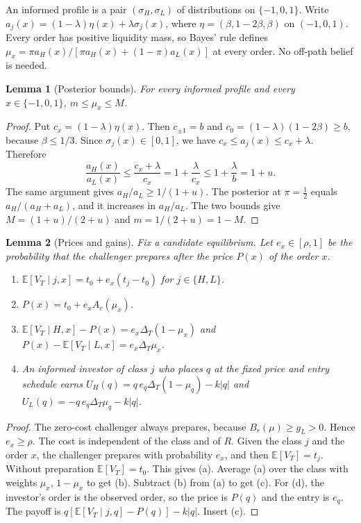 \documentclass[12pt]{article}
\newtheorem{lemma}{Lemma}
\theoremstyle{definition}
\newcommand{\E}{\mathbb E}
\begin{document}
An informed profile is a pair $(\sigma_H,\sigma_L)$ of distributions on $\{-1,0,1\}$.
Write $a_j(x)=(1-\lambda)\eta(x)+\lambda\sigma_j(x)$, where $\eta=(\beta,1-2\beta,\beta)$ on $(-1,0,1)$.
Every order has positive liquidity mass, so Bayes' rule defines $\mu_x=\pi a_H(x)/[\pi a_H(x)+(1-\pi)a_L(x)]$ at every order.
No off-path belief is needed.

\begin{lemma}[Posterior bounds]\label{l:bounds}
For every informed profile and every $x\in\{-1,0,1\}$, $m\le\mu_x\le M$.
\end{lemma}

\begin{proof}
Put $c_x=(1-\lambda)\eta(x)$.
Then $c_{\pm1}=b$ and $c_0=(1-\lambda)(1-2\beta)\ge b$, because $\beta\le 1/3$.
Since $\sigma_j(x)\in[0,1]$, we have $c_x\le a_j(x)\le c_x+\lambda$.
Therefore
\[
\frac{a_H(x)}{a_L(x)}\le\frac{c_x+\lambda}{c_x}=1+\frac{\lambda}{c_x}\le 1+\frac\lambda b=1+u .
\]
The same argument gives $a_H/a_L\ge 1/(1+u)$.
The posterior at $\pi=\tfrac12$ equals $a_H/(a_H+a_L)$, and it increases in $a_H/a_L$.
The two bounds give $M=(1+u)/(2+u)$ and $m=1/(2+u)=1-M$.
\end{proof}

\begin{lemma}[Prices and gains]\label{l:prices}
Fix a candidate equilibrium.
Let $e_x\in[\rho,1]$ be the probability that the challenger prepares after the price $P(x)$ of the order $x$.
\begin{enumerate}[label=(\alph*)]
\item $\E[V_T\mid j,x]=t_0+e_x(t_j-t_0)$ for $j\in\{H,L\}$.
\item $P(x)=t_0+e_xA_r(\mu_x)$.
\item $\E[V_T\mid H,x]-P(x)=e_x\Delta_T(1-\mu_x)$ and $P(x)-\E[V_T\mid L,x]=e_x\Delta_T\mu_x$.
\item An informed investor of class $j$ who places $q$ at the fixed price and entry schedule earns
$U_H(q)=q\,e_q\Delta_T(1-\mu_q)-k|q|$ and $U_L(q)=-q\,e_q\Delta_T\mu_q-k|q|$.
\end{enumerate}
\end{lemma}

\begin{proof}
The zero-cost challenger always prepares, because $B_r(\mu)\ge g_L>0$.
Hence $e_x\ge\rho$.
The cost is independent of the class and of $R$.
Given the class $j$ and the order $x$, the challenger prepares with probability $e_x$, and then $\E[V_T]=t_j$.
Without preparation $\E[V_T]=t_0$.
This gives (a).
Average (a) over the class with weights $\mu_x$, $1-\mu_x$ to get (b).
Subtract (b) from (a) to get (c).
For (d), the investor's order is the observed order, so the price is $P(q)$ and the entry is $e_q$.
The payoff is $q[\E[V_T\mid j,q]-P(q)]-k|q|$.
Insert (c).
\end{proof}
\end{document}
